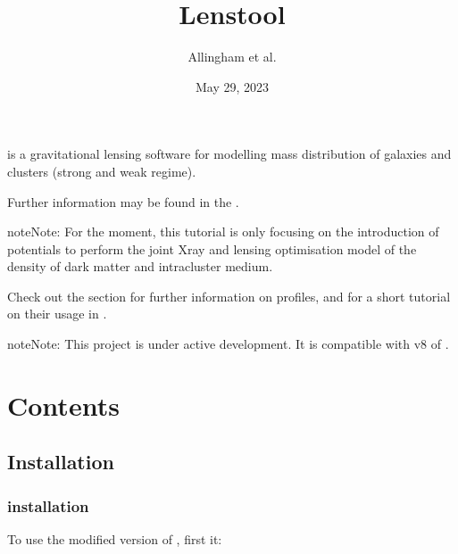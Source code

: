 \documentclass[letterpaper,10pt,english]{sphinxmanual}
\title{Lenstool}
\date{May 29, 2023}
\author{Allingham et al.\@{}}
\begin{document}
\pagestyle{empty}
\sphinxmaketitle
\pagestyle{plain}
\sphinxtableofcontents
\pagestyle{normal}
\label{\detokenize{index::doc}}


\sphinxAtStartPar
{} is a gravitational lensing software for modelling mass distribution of galaxies and clusters (strong and weak regime).

\sphinxAtStartPar
Further information may be found in the .

\begin{sphinxadmonition}{note}{Note:}
\sphinxAtStartPar
For the moment, this tutorial is only focusing on the introduction of  potentials to perform the joint X\sphinxhyphen{}ray and lensing optimisation model of the density of dark matter and intra\sphinxhyphen{}cluster medium.
\end{sphinxadmonition}

\sphinxAtStartPar
Check out the {\hyperref[\detokenize{usage::doc}]{}} section for further information on  profiles, and {\hyperref[\detokenize{tutorial::doc}]{}} for a short tutorial on their usage in .

\begin{sphinxadmonition}{note}{Note:}
\sphinxAtStartPar
This project is under active development. It is compatible with v8 of .
\end{sphinxadmonition}


\chapter{Contents}
\label{\detokenize{index:contents}}

\section{Installation}
\label{\detokenize{installation:installation}}\label{\detokenize{installation::doc}}

\subsection{ installation}
\label{\detokenize{installation:github-installation}}\label{\detokenize{installation:id1}}
\sphinxAtStartPar
To use the modified version of , first  it:
\end{document}
